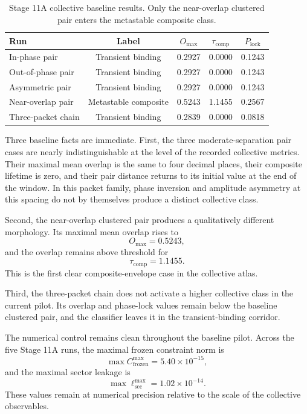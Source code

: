 \documentclass[11pt]{article}
\begin{document}
\begin{table}[t]
\centering
\begin{tabular}{lcccc}
\hline
Run & Label & $O_{\max}$ & $\tau_{\mathrm{comp}}$ & $P_{\mathrm{lock}}$ \\
\hline
In-phase pair & Transient binding & 0.2927 & 0.0000 & 0.1243 \\
Out-of-phase pair & Transient binding & 0.2927 & 0.0000 & 0.1243 \\
Asymmetric pair & Transient binding & 0.2927 & 0.0000 & 0.1243 \\
Near-overlap pair & Metastable composite & 0.5243 & 1.1455 & 0.2567 \\
Three-packet chain & Transient binding & 0.2839 & 0.0000 & 0.0818 \\
\hline
\end{tabular}
\caption{Stage 11A collective baseline results. Only the near-overlap clustered pair enters the metastable composite class.}
\label{tab:11A-runs}
\end{table}

Three baseline facts are immediate.
First, the three moderate-separation pair cases are nearly indistinguishable at the level of the recorded collective metrics. Their maximal mean overlap is the same to four decimal places, their composite lifetime is zero, and their pair distance returns to its initial value at the end of the window. In this packet family, phase inversion and amplitude asymmetry at this spacing do not by themselves produce a distinct collective class.

Second, the near-overlap clustered pair produces a qualitatively different morphology. Its maximal mean overlap rises to
\begin{equation}
O_{\max}=0.5243,
\end{equation}
and the overlap remains above threshold for
\begin{equation}
\tau_{\mathrm{comp}} = 1.1455.
\end{equation}
This is the first clear composite-envelope case in the collective atlas.

Third, the three-packet chain does not activate a higher collective class in the current pilot. Its overlap and phase-lock values remain below the baseline clustered pair, and the classifier leaves it in the transient-binding corridor.

The numerical control remains clean throughout the baseline pilot. Across the five Stage 11A runs, the maximal frozen constraint norm is
\begin{equation}
\max C^{\max}_{\mathrm{frozen}} = 5.40\times 10^{-15},
\end{equation}
and the maximal sector leakage is
\begin{equation}
\max \ell^{\max}_{\mathrm{sec}} = 1.02\times 10^{-14}.
\end{equation}
These values remain at numerical precision relative to the scale of the collective observables.
\end{document}
